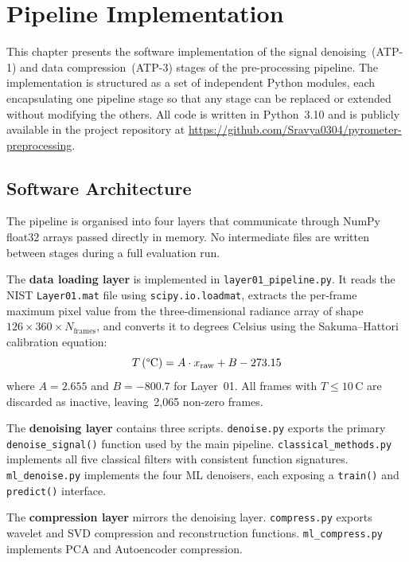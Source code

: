 \chapter{Pipeline Implementation}
\label{cha:implementation}

This chapter presents the software implementation of the signal denoising~(ATP-1)
and data compression~(ATP-3) stages of the pre-processing pipeline. The
implementation is structured as a set of independent Python modules, each
encapsulating one pipeline stage so that any stage can be replaced or extended
without modifying the others. All code is written in Python~3.10 and is publicly
available in the project repository at
\url{https://github.com/Sravya0304/pyrometer-preprocessing}.

\section{Software Architecture}
\label{sec:architecture}

The pipeline is organised into four layers that communicate through NumPy float32
arrays passed directly in memory. No intermediate files are written between
stages during a full evaluation run.

The \textbf{data loading layer} is implemented in \texttt{layer01\_pipeline.py}.
It reads the NIST \texttt{Layer01.mat} file using \texttt{scipy.io.loadmat},
extracts the per-frame maximum pixel value from the three-dimensional radiance
array of shape $126 \times 360 \times N_\text{frames}$, and converts it to
degrees Celsius using the Sakuma--Hattori calibration equation:
\begin{equation}
T\,(\text{\textdegree C}) = A \cdot x_\text{raw} + B - 273.15
\label{eq:sh-impl}
\end{equation}
where $A = 2.655$ and $B = -800.7$ for Layer~01. All frames with
$T \leq 10$\,\textdegree C are discarded as inactive, leaving~2,065 non-zero
frames.

The \textbf{denoising layer} contains three scripts. \texttt{denoise.py} exports
the primary \texttt{denoise\_signal()} function used by the main pipeline.
\texttt{classical\_methods.py} implements all five classical filters with
consistent function signatures. \texttt{ml\_denoise.py} implements the four ML
denoisers, each exposing a \texttt{train()} and \texttt{predict()} interface.

The \textbf{compression layer} mirrors the denoising layer. \texttt{compress.py}
exports wavelet and SVD compression and reconstruction functions.
\texttt{ml\_compress.py} implements PCA and Autoencoder compression.

